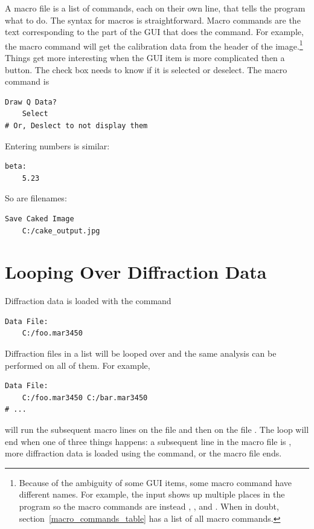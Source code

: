 A macro file is a list of commands, each on their own line, that tells the 
program what to do.
The syntax for macros is straightforward. Macro commands are the 
text corresponding to the part of the GUI that does 
the command. 
For example, the macro command  
will get the calibration data from the header of the 
image.\footnote{Because of the ambiguity of some GUI items,
some macro command have different names. 
For example, the  input shows up multiple
places in the program so the macro commands are instead
, ,
and . When in doubt, 
section~\ref{macro_commands_table} has a list of all macro commands.}
Things get more interesting when the GUI item is more complicated
then a button. The  check box needs to know if it 
is selected or deselect. The macro command is
\begin{lstlisting}
Draw Q Data?
    Select
# Or, Deslect to not display them
\end{lstlisting}
Entering numbers is similar:
\begin{lstlisting}
beta:
    5.23
\end{lstlisting}
So are filenames:
\begin{lstlisting}
Save Caked Image
    C:/cake_output.jpg
\end{lstlisting}

\section{Looping Over Diffraction Data}
\label{LoopOverDiffractionData}

Diffraction data is loaded with the command
\begin{lstlisting}
Data File:
    C:/foo.mar3450
\end{lstlisting}
Diffraction files in a list will be looped over and the same
analysis can be performed on all of them.
For example,
\begin{lstlisting}
Data File:
    C:/foo.mar3450 C:/bar.mar3450 
# ...
\end{lstlisting}
will run the subsequent macro lines on
the file  and
then on the file .
The loop will end when one of three things happens: a subsequent line 
in the macro file is , more diffraction data
is loaded using the  command, or
the macro file ends. 

